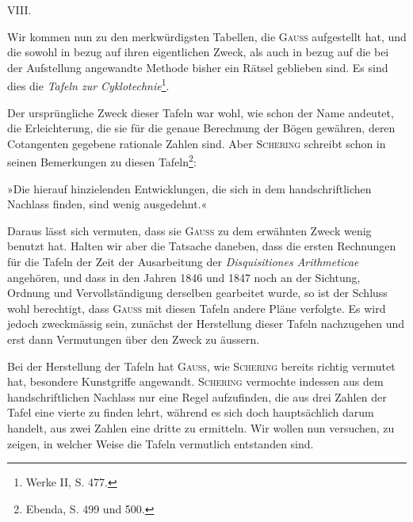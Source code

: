 \clearpage\begingroup{}
\renewcommand{\thefootnote}{\arabic{footnote})}\setcounter{footnote}{0}
\begin{center}VIII.\\[3pt]{\large{}}\end{center}
\noindent\hspace*{\parindent}Wir kommen nun zu den merkwürdigsten Tabellen, die \textsc{Gauss} aufgestellt
hat, und die sowohl in bezug auf ihren eigentlichen Zweck, als auch in bezug
auf die bei der Aufstellung angewandte Methode bisher ein Rätsel geblieben
sind. Es sind dies die \textit{Tafeln zur Cyklotechnie}\footnote{Werke II, S. 477.}.

Der ursprüngliche Zweck dieser Tafeln war wohl, wie schon der Name
andeutet, die Erleichterung, die sie für die genaue Berechnung der Bögen
gewähren, deren Cotangenten gegebene rationale Zahlen sind. Aber \textsc{Schering}
schreibt schon in seinen Bemerkungen zu diesen Tafeln\footnote{Ebenda, S. 499 und 500.}:

»Die hierauf hinzielenden Entwicklungen, die sich in dem handschriftlichen Nachlass finden, sind wenig ausgedehnt.«

Daraus lässt sich vermuten, dass sie \textsc{Gauss} zu dem erwähnten Zweck
wenig benutzt hat. Halten wir aber die Tatsache daneben, dass die ersten
Rechnungen für die Tafeln der Zeit der Ausarbeitung der \textit{Disquisitiones Arithmeticae} angehören, und dass in den Jahren 1846 und 1847 noch an der Sichtung, Ordnung und Vervollständigung derselben gearbeitet wurde, so ist der
Schluss wohl berechtigt, dass \textsc{Gauss} mit diesen Tafeln andere Pläne verfolgte.
Es wird jedoch zweckmässig sein, zunächst der Herstellung dieser Tafeln nachzugehen und erst dann Vermutungen über den Zweck zu äussern.

Bei der Herstellung der Tafeln hat \textsc{Gauss}, wie \textsc{Schering} bereits richtig
vermutet hat, besondere Kunstgriffe angewandt. \textsc{Schering} vermochte indessen
aus dem handschriftlichen Nachlass nur eine Regel aufzufinden, die aus drei
Zahlen der Tafel eine vierte zu finden lehrt, während es sich doch hauptsächlich darum handelt, aus zwei Zahlen eine dritte zu ermitteln. Wir wollen
nun versuchen, zu zeigen, in welcher Weise die Tafeln vermutlich entstanden
sind.


